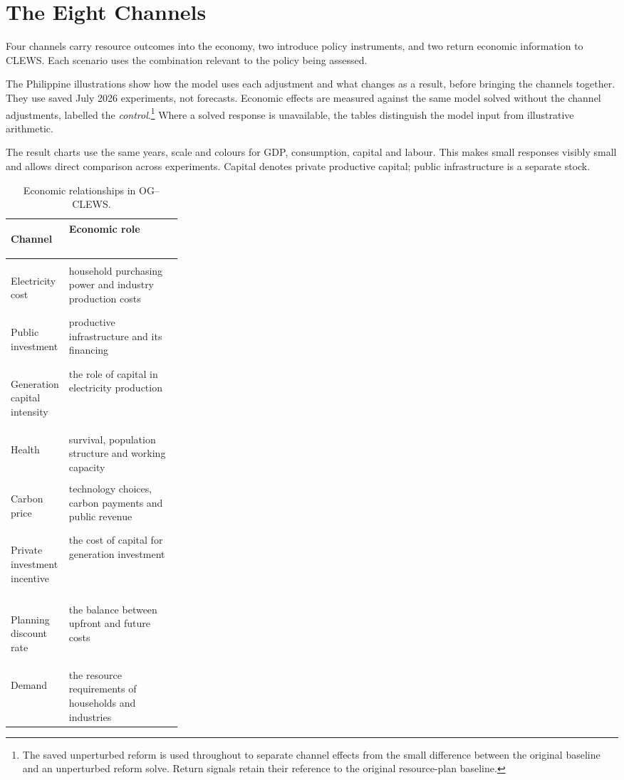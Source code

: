 \section{The Eight Channels}
\label{sec:two-models}

Four channels carry resource outcomes into the economy, two introduce policy instruments,
and two return economic information to CLEWS. Each scenario uses the combination relevant
to the policy being assessed.

The Philippine illustrations show how the model uses each adjustment and what
changes as a result, before bringing the channels together. They use saved July 2026
experiments, not forecasts. Economic effects are measured against the same model
solved without the channel adjustments, labelled the \emph{control}.\footnote{The
saved unperturbed reform is used throughout to separate channel effects from the
small difference between the original baseline and an unperturbed reform solve.
Return signals retain their reference to the original resource-plan baseline.}
Where a solved response is unavailable, the tables distinguish the model input
from illustrative arithmetic.

The result charts use the same years, scale and colours for GDP, consumption,
capital and labour. This makes small responses visibly small and allows direct
comparison across experiments. Capital denotes private productive capital;
public infrastructure is a separate stock.

\begin{table}[H]
\centering\small
\caption{Economic relationships in OG--CLEWS.}
\label{tab:two-way}
\begin{tabularx}{\linewidth}{@{}>{\bfseries\raggedright\arraybackslash}p{0.28\linewidth} L@{}}
\toprule
Channel & Economic role \\
\midrule
{} \\
Electricity cost & household purchasing power and industry production costs \\
Public investment & productive infrastructure and its financing \\
Generation capital intensity & the role of capital in electricity production \\
Health & survival, population structure and working capacity \\
\addlinespace
{} \\
Carbon price & technology choices, carbon payments and public revenue \\
Private investment incentive & the cost of capital for generation investment \\
\addlinespace
{} \\
Planning discount rate & the balance between upfront and future costs \\
Demand & the resource requirements of households and industries \\
\bottomrule
\end{tabularx}
\end{table}
